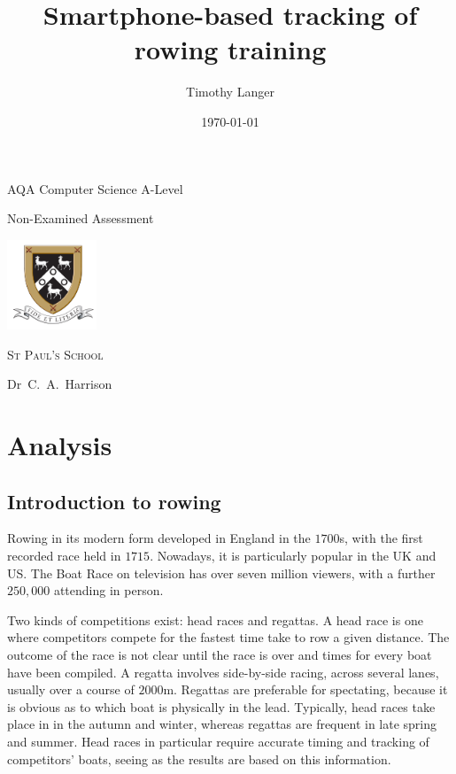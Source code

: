 \documentclass[11pt,twoside,a4paper]{report}
\author{Timothy Langer}
\title{Smartphone-based tracking of rowing training}
\date{\today}
\begin{document}
\begin{titlepage}
  \centering
  \vspace*{1cm}
  {\bfseries \huge \@title \par}
  \vspace{2cm}
  {\large AQA Computer Science A-Level \par Non-Examined Assessment \par}
  \vspace{1.5cm}
  {\LARGE \@author \par}
  \vfill
  \includegraphics[width=0.2\textwidth]{sps-logo} \par
  {\scshape\LARGE St Paul's School \par}
  Dr~C.~A.~Harrison \par
  \vspace{1cm}
  {\large \@date \par}
  \vspace*{1cm}
\end{titlepage}

\makeatother

\tableofcontents

\chapter{Analysis}

\section{Introduction to rowing}

Rowing in its modern form developed in England in the $1700$s, with the first recorded race held in $1715$. 
Nowadays, it is particularly popular in the UK and US. 
The Boat Race on television has over seven million viewers, with a further $250,000$ attending in person.\cite{the_boat_race} 

Two kinds of competitions exist: head races and regattas. 
A head race is one where competitors compete for the fastest time take to row a given distance. 
The outcome of the race is not clear until the race is over and times for every boat have been compiled.
A regatta involves side-by-side racing, across several lanes, usually over a course of $2000 \si{\meter}$.
Regattas are preferable for spectating, because it is obvious as to which boat is physically in the lead.
Typically, head races take place in in the autumn and winter, whereas regattas are frequent in late spring and summer.
Head races in particular require accurate timing and tracking of competitors' boats, seeing as the results are based on this information.
\end{document}
